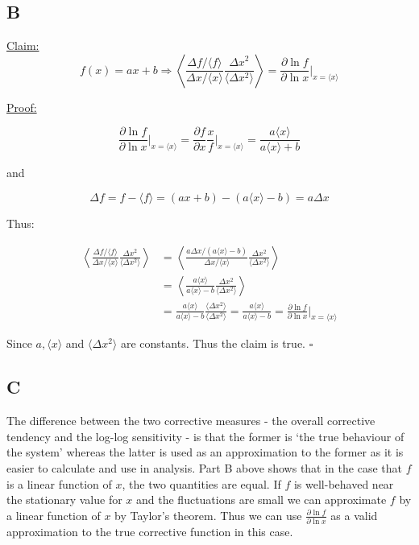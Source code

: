 \documentclass[a4paper,12pt]{article}
\begin{document}
\subsection*{B}

\underline{Claim:} \[f(x) = a x+b \Rightarrow \left \langle \frac{\Delta f / \langle f \rangle}{\Delta x / \langle x \rangle}  \frac{{\Delta x}^2}{\langle \Delta x^2 \rangle} \right \rangle = \frac{\partial \ln f}{\partial \ln x} \bigg|_{x=\langle x \rangle} \]

\noindent \underline{Proof:}

\[ \frac{\partial \ln f}{\partial \ln x} \bigg|_{x=\langle x \rangle} = \frac{\partial f}{\partial x} \frac{x}{f} \bigg|_{x=\langle x \rangle} = \frac{a\langle x \rangle}{a \langle x \rangle + b}\]

and

\[ \Delta f = f - \langle f \rangle = (ax+b) - (a \langle x \rangle - b) = a \Delta x\]

Thus:

\begin{align*}
\left \langle \frac{\Delta f / \langle f \rangle}{\Delta x / \langle x \rangle} \frac{{\Delta x}^2}{\langle \Delta x^2 \rangle} \right \rangle & = \left \langle \frac{a \Delta x /( a \langle x \rangle - b)}{\Delta x / \langle x \rangle} \frac{\Delta x ^2}{\langle \Delta x ^2 \rangle} \right \rangle \\
&= \left \langle \frac{a \langle x \rangle}{a \langle x \rangle - b} \frac{\Delta x ^2}{\langle \Delta x ^2 \rangle} \right \rangle \\
&= \frac{a \langle x \rangle}{a \langle x \rangle - b} \frac{\langle \Delta x ^2 \rangle}{\langle \Delta x ^2 \rangle} = \frac{a \langle x \rangle}{a \langle x \rangle - b} = \frac{\partial \ln f}{\partial \ln x} \bigg|_{x=\langle x \rangle}
\end{align*}

Since $a, \langle x \rangle$ and $\langle \Delta x^2\rangle$ are constants. Thus the claim is true.  $\square$

\subsection*{C}

The difference between the two corrective measures - the overall corrective tendency and the log-log sensitivity - is that the former is `the true behaviour of the system' whereas the latter is used as an approximation to the former as it is easier to calculate and use in analysis. Part B above shows that in the case that $f$ is a linear function of $x$, the two quantities are equal. If $f$ is well-behaved near the stationary value for $x$ and the fluctuations are small we can approximate $f$ by a linear function of $x$ by Taylor's theorem. Thus we can use $\frac{\partial \ln f}{\partial \ln x}$ as a valid approximation to the true corrective function in this case.
\end{document}
